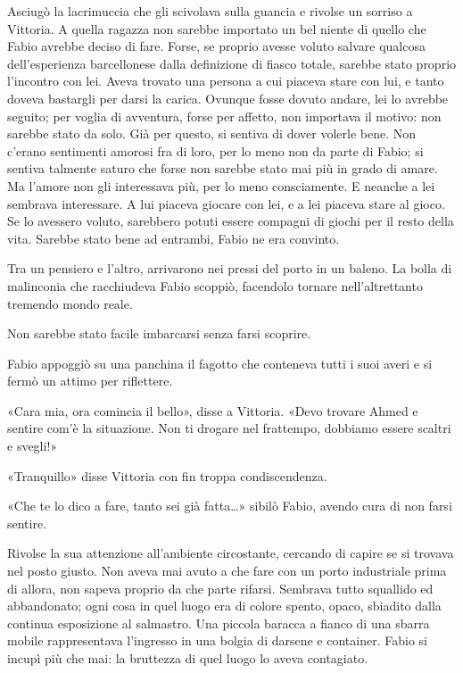 Asciugò la lacrimuccia che gli scivolava sulla guancia e rivolse un sorriso a Vittoria. A quella ragazza non sarebbe importato un bel niente di quello che Fabio avrebbe deciso di fare. Forse, se proprio avesse voluto salvare qualcosa dell'esperienza barcellonese dalla definizione di fiasco totale, sarebbe stato proprio l'incontro con lei. Aveva trovato una persona a cui piaceva stare con lui, e tanto doveva bastargli per darsi la carica. Ovunque fosse dovuto andare, lei lo avrebbe seguito; per voglia di avventura, forse per affetto, non importava il motivo: non sarebbe stato da solo. Già per questo, si sentiva di dover volerle bene. Non c'erano sentimenti amorosi fra di loro, per lo meno non da parte di Fabio; si sentiva talmente saturo che forse non sarebbe stato mai più in grado di amare. Ma l'amore non gli interessava più, per lo meno consciamente. E neanche a lei sembrava interessare. A lui piaceva giocare con lei, e a lei piaceva stare al gioco. Se lo avessero voluto, sarebbero potuti essere compagni di giochi per il resto della vita. Sarebbe stato bene ad entrambi, Fabio ne era convinto.

Tra un pensiero e l'altro, arrivarono nei pressi del porto in un baleno. La bolla di malinconia che racchiudeva Fabio scoppiò, facendolo tornare nell'altrettanto tremendo mondo reale. 

Non sarebbe stato facile imbarcarsi senza farsi scoprire. 

Fabio appoggiò su una panchina il fagotto che conteneva tutti i suoi averi e si fermò un attimo per riflettere.

«Cara mia, ora comincia il bello», disse a Vittoria. «Devo trovare Ahmed e sentire com'è la situazione. Non ti drogare nel frattempo, dobbiamo essere scaltri e svegli!»

«Tranquillo» disse Vittoria con fin troppa condiscendenza.

«Che te lo dico a fare, tanto sei già fatta\ldots» sibilò Fabio, avendo cura di non farsi sentire.

Rivolse la sua attenzione all'ambiente circostante, cercando di capire se si trovava nel posto giusto. Non aveva mai avuto a che fare con un porto industriale prima di allora, non sapeva proprio da che parte rifarsi. Sembrava tutto squallido ed abbandonato; ogni cosa in quel luogo era di colore spento, opaco, sbiadito dalla continua esposizione al salmastro. Una piccola baracca a fianco di una sbarra mobile rappresentava l'ingresso in una bolgia di darsene e container. Fabio si incupì più che mai: la bruttezza di quel luogo lo aveva contagiato.

